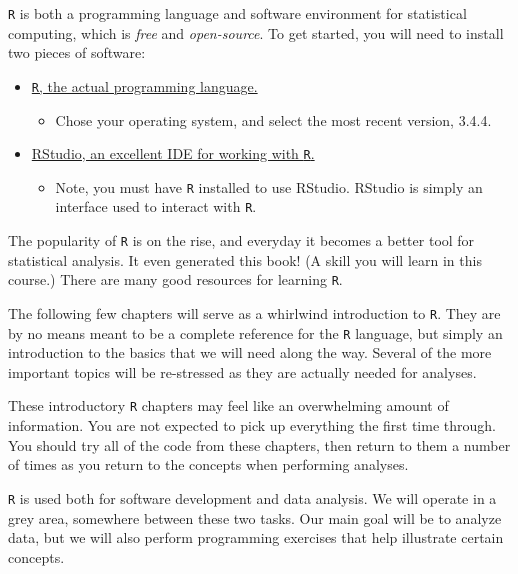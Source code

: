 \documentclass[]{book}
\providecommand{\tightlist}{%
  \setlength{\itemsep}{0pt}\setlength{\parskip}{0pt}}
\theoremstyle{definition}
\theoremstyle{definition}
\theoremstyle{definition}
\theoremstyle{remark}
\begin{document}
\texttt{R} is both a programming language and software environment for
statistical computing, which is \emph{free} and \emph{open-source}. To
get started, you will need to install two pieces of software:

\begin{itemize}
\tightlist
\item
  \href{https://www.r-project.org}{\texttt{R}, the actual programming
  language.}

  \begin{itemize}
  \tightlist
  \item
    Chose your operating system, and select the most recent version,
    3.4.4.
  \end{itemize}
\item
  \href{http://www.rstudio.com/}{RStudio, an excellent IDE for working
  with \texttt{R}.}

  \begin{itemize}
  \tightlist
  \item
    Note, you must have \texttt{R} installed to use RStudio. RStudio is
    simply an interface used to interact with \texttt{R}.
  \end{itemize}
\end{itemize}

The popularity of \texttt{R} is on the rise, and everyday it becomes a
better tool for statistical analysis. It even generated this book! (A
skill you will learn in this course.) There are many good resources for
learning \texttt{R}.

The following few chapters will serve as a whirlwind introduction to
\texttt{R}. They are by no means meant to be a complete reference for
the \texttt{R} language, but simply an introduction to the basics that
we will need along the way. Several of the more important topics will be
re-stressed as they are actually needed for analyses.

These introductory \texttt{R} chapters may feel like an overwhelming
amount of information. You are not expected to pick up everything the
first time through. You should try all of the code from these chapters,
then return to them a number of times as you return to the concepts when
performing analyses.

\texttt{R} is used both for software development and data analysis. We
will operate in a grey area, somewhere between these two tasks. Our main
goal will be to analyze data, but we will also perform programming
exercises that help illustrate certain concepts.
\end{document}
